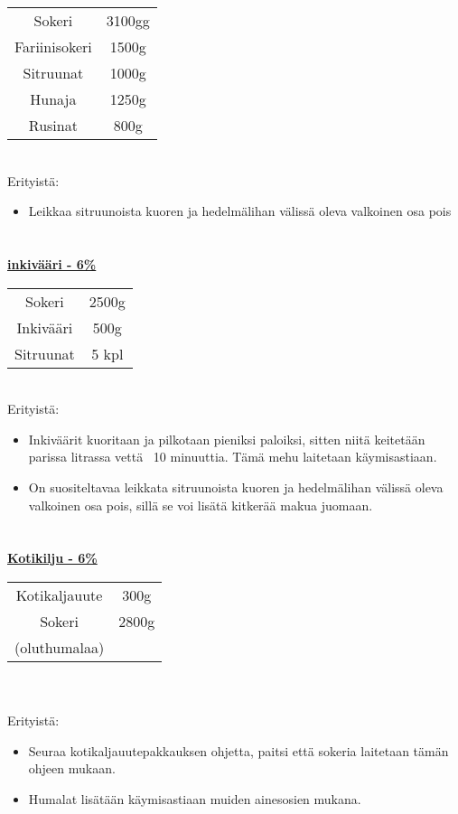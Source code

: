 \documentclass[20pt, a4]{article}
\begin{document}
{    \begin{tabular}{ cc } 
        Sokeri & 3100gg \\
        Fariinisokeri & 1500g\\
        Sitruunat & 1000g \\
        Hunaja & 1250g \\
        Rusinat & 800g
    \end{tabular}
    \\

    Erityistä:
    \begin{itemize}
        \item Leikkaa sitruunoista kuoren ja hedelmälihan välissä oleva valkoinen osa pois
    \end{itemize}

    \pagebreak
    \section{}


    \underline{\textbf{inkivääri - 6\%}}

    \begin{tabular}{ cc } 
    Sokeri & 2500g\\
    Inkivääri & 500g\\
    Sitruunat & 5 kpl\\

    \end{tabular}
    \\

    Erityistä:
    \begin{itemize}
        \item Inkiväärit kuoritaan ja pilkotaan pieniksi paloiksi, sitten niitä keitetään parissa litrassa vettä ~10 minuuttia. Tämä mehu laitetaan käymisastiaan. 
        \item On suositeltavaa leikkata sitruunoista kuoren ja hedelmälihan välissä oleva valkoinen osa pois, sillä se voi lisätä kitkerää makua juomaan.
    \end{itemize}
    
    \pagebreak
    \section{}
    \underline{\textbf{Kotikilju - 6\%}}


    \begin{tabular}{ cc } 
        Kotikaljauute & 300g\\
        Sokeri & 2800g\\
        (oluthumalaa)&
    \end{tabular}
    \\
    \\
    Erityistä:
    \begin{itemize}
        \item Seuraa kotikaljauutepakkauksen ohjetta, paitsi että sokeria laitetaan tämän ohjeen mukaan. 
        \item Humalat lisätään käymisastiaan muiden ainesosien mukana.
    \end{itemize}

}
\end{document}
